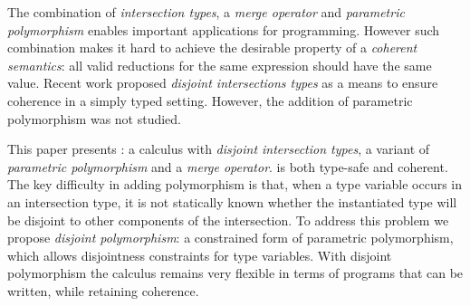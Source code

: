 The combination of \emph{intersection types}, a \emph{merge operator} 
and \emph{parametric polymorphism} enables
important applications for programming. However such combination makes
it hard to achieve the desirable property of a \emph{coherent
semantics}: all valid reductions for the same expression should
have the same value. Recent work proposed \emph{disjoint
intersections types} as a means to ensure coherence in a simply typed
setting. However, the addition of parametric polymorphism was not
studied.

This paper presents \name: a calculus with 
\emph{disjoint intersection types}, a variant of \emph{parametric polymorphism} and a
\emph{merge operator}. \name is both type-safe and
coherent. The key difficulty in adding polymorphism is that, when a type variable occurs in an intersection
type, it is not statically known whether the instantiated type will be
disjoint to other components of the intersection. To address this
problem we propose \emph{disjoint polymorphism}: a constrained form of
parametric polymorphism, which allows 
disjointness constraints for type variables. With disjoint
polymorphism the calculus remains very flexible in terms of programs
that can be written, while retaining coherence.

\begin{comment}
Coherence is achieved by ensuring that intersection types
are \emph{disjoint}. The approach works in the presence of parametric
polymorphism. However, parametric polymorphism makes the problem of coherence
significantly harder. When a type variable occurs in an intersection
type, it is not statically known whether the instantiated type will
be disjoint to other components of the intersection.
To address this problem we propose \emph{disjoint polymorphism}: a
constrained form of parametric polymorphism, that allows programmers
to specify disjointness constraints for type variables. With disjoint
polymorphism the calculus remains very flexible in terms of programs
that can be written with intersection types, while retaining coherence.
\end{comment}